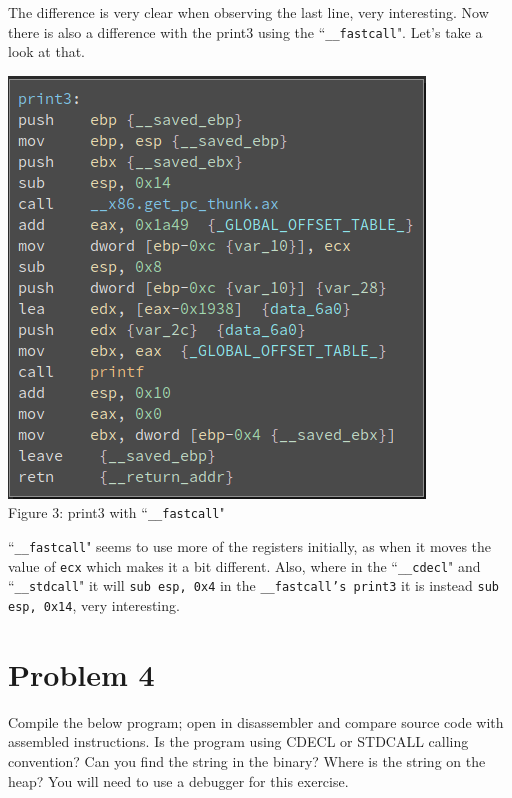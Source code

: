 \documentclass[12pt]{article}
\newcommand\tab[1][0.5cm]{\hspace*{#1}}
\begin{document}
The difference is very clear when observing the last line, very interesting. Now there is also a difference with the print3 using the
``\texttt{\_\_fastcall}". Let's take a look at that. 

\begin{center}
	\includegraphics[scale=0.65]{print3.png} \\
	Figure 3: print3 with ``\texttt{\_\_fastcall}"
\end{center}

``\texttt{\_\_fastcall}" seems to use more of the registers initially, as when it moves the value of \texttt{ecx} which makes it a bit
different. Also, where in the ``\texttt{\_\_cdecl}" and ``\texttt{\_\_stdcall}" it will \texttt{sub esp, 0x4} in the \texttt{\_\_fastcall's
print3} it is instead \texttt{sub esp, 0x14}, very interesting. 



\newpage

\section{Problem 4}
\tab Compile the below program; open in disassembler and compare source code with assembled
instructions. Is the program using CDECL or STDCALL calling convention? Can you find the
string in the binary? Where is the string on the heap? You will need to use a debugger for this
exercise.
\end{document}
